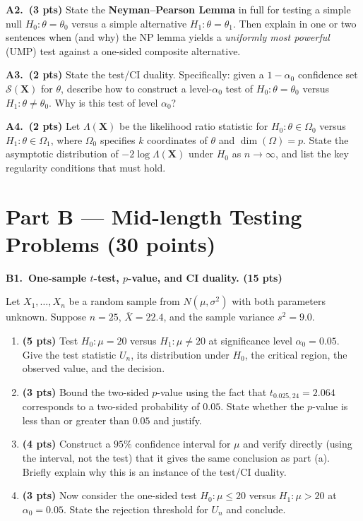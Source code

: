 \documentclass[11pt]{article}
\begin{document}
\vspace{0.4em}

\textbf{A2.\ (3 pts)} State the \textbf{Neyman--Pearson Lemma} in full for testing a simple null $H_0\!: \theta = \theta_0$ versus a simple alternative $H_1\!: \theta = \theta_1$. Then explain in one or two sentences when (and why) the NP lemma yields a \emph{uniformly most powerful} (UMP) test against a one-sided composite alternative.

\vspace{0.4em}

\textbf{A3.\ (2 pts)} State the test/CI duality. Specifically: given a $1-\alpha_0$ confidence set $\mathcal{S}(\mathbf{X})$ for $\theta$, describe how to construct a level-$\alpha_0$ test of $H_0\!: \theta = \theta_0$ versus $H_1\!: \theta \neq \theta_0$. Why is this test of level $\alpha_0$?

\vspace{0.4em}

\textbf{A4.\ (2 pts)} Let $\Lambda(\mathbf{X})$ be the likelihood ratio statistic for $H_0\!: \theta \in \Omega_0$ versus $H_1\!: \theta \in \Omega_1$, where $\Omega_0$ specifies $k$ coordinates of $\theta$ and $\dim(\Omega) = p$. State the asymptotic distribution of $-2\log \Lambda(\mathbf{X})$ under $H_0$ as $n \to \infty$, and list the key regularity conditions that must hold.

\newpage
\section*{Part B --- Mid-length Testing Problems (30 points)}

\textbf{B1.\ One-sample $t$-test, $p$-value, and CI duality. (15 pts)}

Let $X_1, \dots, X_n$ be a random sample from $N(\mu, \sigma^2)$ with both parameters unknown. Suppose $n = 25$, $\overline{X} = 22.4$, and the sample variance $s^2 = 9.0$.

\begin{enumerate}[label=(\alph*), leftmargin=*]
    \item \textbf{(5 pts)} Test $H_0\!: \mu = 20$ versus $H_1\!: \mu \neq 20$ at significance level $\alpha_0 = 0.05$. Give the test statistic $U_n$, its distribution under $H_0$, the critical region, the observed value, and the decision.
    \item \textbf{(3 pts)} Bound the two-sided $p$-value using the fact that $t_{0.025, 24} = 2.064$ corresponds to a two-sided probability of $0.05$. State whether the $p$-value is less than or greater than $0.05$ and justify.
    \item \textbf{(4 pts)} Construct a $95\%$ confidence interval for $\mu$ and verify directly (using the interval, not the test) that it gives the same conclusion as part (a). Briefly explain why this is an instance of the test/CI duality.
    \item \textbf{(3 pts)} Now consider the one-sided test $H_0\!: \mu \le 20$ versus $H_1\!: \mu > 20$ at $\alpha_0 = 0.05$. State the rejection threshold for $U_n$ and conclude.
\end{enumerate}
\end{document}
